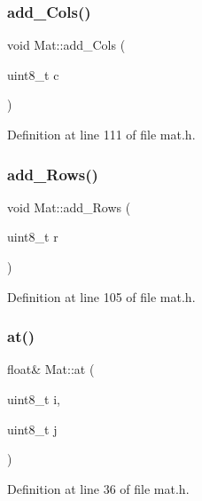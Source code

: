 \subsubsection{\texorpdfstring{add\_Cols()}{add\_Cols()}}
{\footnotesize\ttfamily void Mat\+::add\+\_\+\+Cols (\begin{DoxyParamCaption}\item[{uint8\+\_\+t}]{c }\end{DoxyParamCaption})\hspace{0.3cm}{\ttfamily [inline]}}



Definition at line 111 of file mat.\+h.

\mbox{\label{class_mat_ae5b6c8fc154b2ac9707c5312a94215f9}} 
\subsubsection{\texorpdfstring{add\_Rows()}{add\_Rows()}}
{\footnotesize\ttfamily void Mat\+::add\+\_\+\+Rows (\begin{DoxyParamCaption}\item[{uint8\+\_\+t}]{r }\end{DoxyParamCaption})\hspace{0.3cm}{\ttfamily [inline]}}



Definition at line 105 of file mat.\+h.

\mbox{\label{class_mat_a5f4b8f7e3c55a1caf7161c11ec2a2465}} 
\subsubsection{\texorpdfstring{at()}{at()}}
{\footnotesize\ttfamily float\& Mat\+::at (\begin{DoxyParamCaption}\item[{uint8\+\_\+t}]{i,  }\item[{uint8\+\_\+t}]{j }\end{DoxyParamCaption})\hspace{0.3cm}{\ttfamily [inline]}}



Definition at line 36 of file mat.\+h.

